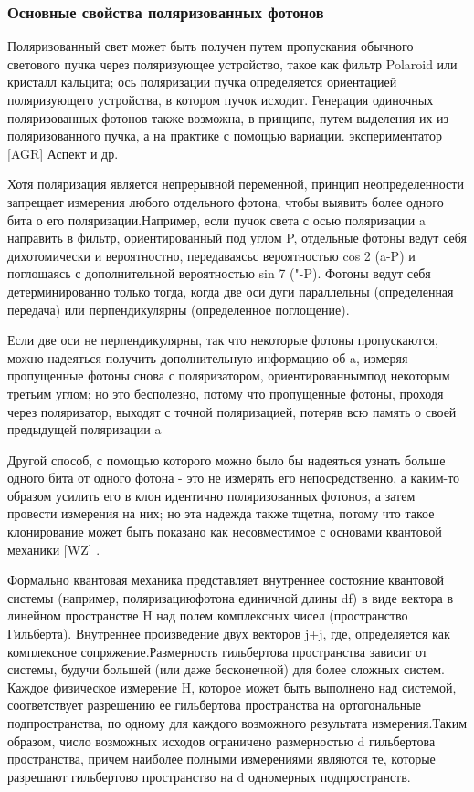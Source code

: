 \subsubsection{Основные свойства поляризованных фотонов}

­Поляризованный свет может быть получен путем пропускания обычного светового пучка через поляризующее устройство, такое как фильтр Polaroid или кристалл кальцита; ось поляризации пучка определяется ориентацией поляризующего устройства, в котором пучок исходит. Генерация одиночных поляризованных фотонов также возможна, в принципе, путем выделения их из поляризованного пучка, а на практике с помощью вариации. экспериментатор [AGR] Аспект и др.

­­Хотя поляризация является непрерывной переменной, принцип неопределенности запрещает измерения любого отдельного фотона, чтобы выявить более одного бита о его поляризации.Например, если пучок света с осью поляризации a направить в фильтр, ориентированный под углом P, отдельные фотоны ведут себя дихотомически и вероятностно, передаваясьс вероятностью cos 2 (a-P) и поглощаясь с дополнительной вероятностью sin 7 ("-P). Фотоны ведут себя детерминированно только тогда, когда две оси дуги параллельны (определенная передача) или перпендикулярны (определенное поглощение).

­­­Если две оси не перпендикулярны, так что некоторые фотоны пропускаются, можно надеяться получить дополнительную информацию об a, измеряя пропущенные фотоны снова с поляризатором, ориентированнымпод некоторым третьим углом; но это бесполезно, потому что пропущенные фотоны, проходя через поляризатор, выходят с точной поляризацией, потеряв всю память о своей предыдущей поляризации a

Другой способ, с помощью которого можно было бы надеяться узнать больше одного бита от одного фотона - это не измерять его непосредственно, а каким-то образом усилить его в клон идентично поляризованных фотонов, а затем провести измерения на них; но эта надежда также тщетна, потому что такое клонирование может быть показано как несовместимое с основами квантовой механики [WZ] .

­­­­Формально квантовая механика представляет внутреннее состояние квантовой системы (например, поляризациюфотона единичной длины df) в виде вектора в линейном пространстве H над полем комплексных чисел (пространство Гильберта). Внутреннее произведение двух векторов j+j, где, определяется как комплексное сопряжение.Размерность гильбертова пространства зависит от системы, будучи большей (или даже бесконечной) для более сложных систем. Каждое физическое измерение H, которое может быть выполнено над системой, соответствует разрешению ее гильбертова пространства на ортогональные подпространства, по одному для каждого возможного результата измерения.Таким образом, число возможных исходов ограничено размерностью d гильбертова пространства, причем наиболее полными измерениями являются те, которые разрешают гильбертово пространство на d одномерных подпространств.


